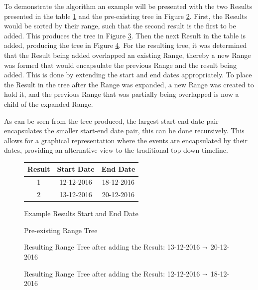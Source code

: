 \par To demonstrate the algorithm an example will be presented with the two Results presented in the table \ref{fig:resultsTable} and the pre-existing tree in Figure \ref{fig:rangeTreePre}. First, the Results would be sorted by their range, such that the second result is the first to be added. This produces the tree in Figure \ref{fig:rangeTree1}. Then the next Result in the table is added, producing the tree in Figure \ref{fig:rangeTree2}. For the resulting tree, it was determined that the Result  being added overlapped an existing Range, thereby a new Range was formed that would encapsulate the previous Range and the result being added. This is done by extending the start and end dates appropriately. To place the Result in the tree after the Range was expanded, a new Range was created to hold it, and the previous Range that was partially being overlapped is now a child of the expanded Range.
\par As can be seen from the tree produced, the largest start-end date pair encapsulates the smaller start-end date pair, this can be done recursively. This allows for a graphical representation where the events are encapsulated by their dates, providing an alternative view to the traditional top-down timeline.
\begin{figure}[H]
\begin{center}
\begin{tabular}{ |c|c|c| } 
 \hline
Result & Start Date & End Date \\
\hline
\hline
1 & 12-12-2016 & 18-12-2016 \\
2 & 13-12-2016 & 20-12-2016 \\
 \hline
\end{tabular}
\end{center}
\caption{Example Results Start and End Date}
\label{fig:resultsTable}
\end{figure}
\begin{figure}[H]
\resizebox{\linewidth}{!}{
\Tree
 [.{01-01-1980  $\shortrightarrow$ 31-12-2016}
	[.{01-01-2008  $\shortrightarrow$ 31-05-2016} {01-01-2015} ]
	[{01-11-2016} ] 
]
}
\caption{Pre-existing Range Tree}
\label{fig:rangeTreePre}
\end{figure}
\begin{figure}[H]
\resizebox{\linewidth}{!}{
\Tree
 [.{01-01-1980 $\shortrightarrow$ 31-12-2016}
	[.{01-01-2008  $\shortrightarrow$ 31-05-2016} {01-01-2015} ]
	[{13-12-2016  $\shortrightarrow$ 20-12-2016} ]
	[{01-11-2016} ] 
]
}
\caption{Resulting Range Tree after adding the Result: 13-12-2016  $\shortrightarrow$ 20-12-2016}
\label{fig:rangeTree1}
\end{figure}
\begin{figure}[H]
\caption{Resulting Range Tree after adding the Result: 12-12-2016 $\shortrightarrow$ 18-12-2016}
\label{fig:rangeTree2}
\end{figure}

